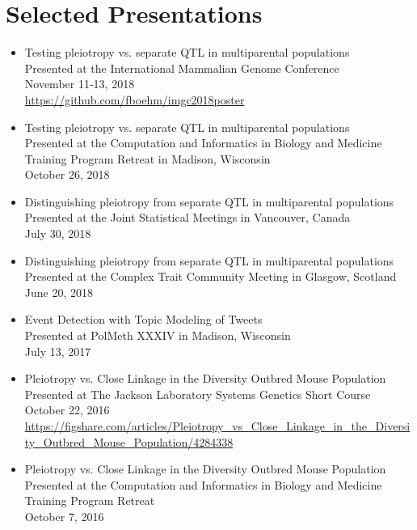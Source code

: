 \section*{Selected Presentations}

\begin{itemize}

\item Testing pleiotropy vs. separate QTL in multiparental populations\\
Presented at the International Mammalian Genome Conference\\
November 11-13, 2018\\
\url{https://github.com/fboehm/imgc2018poster}


\item Testing pleiotropy vs. separate QTL in multiparental populations\\
Presented at the Computation and Informatics in Biology and Medicine Training Program Retreat in Madison, Wisconsin\\
October 26, 2018\\





\item Distinguishing pleiotropy from separate QTL in multiparental populations\\
Presented at the Joint Statistical Meetings in Vancouver, Canada\\
July 30, 2018\\


\item Distinguishing pleiotropy from separate QTL in multiparental populations\\
Presented at the Complex Trait Community Meeting in Glasgow, Scotland\\
June 20, 2018\\

\item Event Detection with Topic Modeling of Tweets\\
Presented at PolMeth XXXIV in Madison, Wisconsin\\
July 13, 2017\\
\item Pleiotropy vs. Close Linkage in the Diversity Outbred Mouse Population\\
Presented at The Jackson Laboratory Systems Genetics Short Course\\
October 22, 2016\\
\url{https://figshare.com/articles/Pleiotropy_vs_Close_Linkage_in_the_Diversity_Outbred_Mouse_Population/4284338}
\item Pleiotropy vs. Close Linkage in the Diversity Outbred Mouse Population\\
Presented at the Computation and Informatics in Biology and Medicine Training Program Retreat\\
October 7, 2016


\end{itemize}
